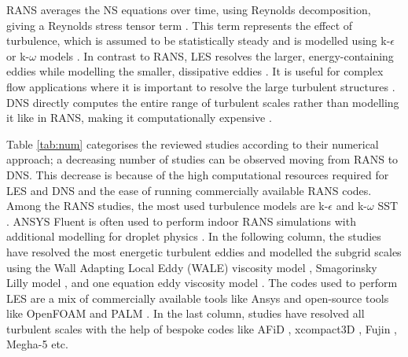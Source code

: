 \documentclass[a4paper,12pt]{elsarticle}
\begin{document}
RANS averages the NS equations over time, using Reynolds decomposition,
giving a Reynolds stress tensor term \cite{wilcox2006turbulence}. This term represents the effect of turbulence, which is assumed to be statistically steady and is modelled using k-$\epsilon$ or k-$\omega$ models \cite{pope2000turbulent}. In contrast to RANS, LES resolves the larger, energy-containing eddies while modelling the smaller, dissipative eddies \cite{sagaut2006large}. It is useful for complex flow applications where it is important to resolve the large turbulent structures \cite{smagorinsky1963general}. DNS directly computes the entire range of turbulent scales rather than modelling it like in RANS, making it computationally expensive \cite{moin2011dns}. 

Table \ref{tab:num} categorises the reviewed studies according to their numerical approach; a decreasing number of studies can be observed moving from RANS to DNS. This decrease is because of the high computational resources required for LES and DNS and the ease of running commercially available RANS codes. Among the RANS studies, the most used turbulence models are k-$\epsilon$ \cite{ren2021numerical,ou2022insufficient} and k-$\omega$ SST \cite{dbouk2020coughing,yan2021transmission}. ANSYS Fluent is often used to perform indoor RANS simulations with additional modelling for droplet physics \cite{li2020investigating,wei2023effects}. In the following column, the studies have resolved the most energetic turbulent eddies and modelled the subgrid scales using the Wall Adapting Local Eddy (WALE) viscosity model \cite{feng2020study,zhang2019distribution}, Smagorinsky Lilly model \cite{wu2023numerical,li2022airborne}, and one equation eddy viscosity model \cite{pendar2020numerical}. The codes used to perform LES are a mix of commercially available tools like Ansys \cite{saarinen2015large,feng2020study} and open-source tools like OpenFOAM and PALM \cite{vuorinen2020modelling}. In the last column, studies have resolved all turbulent scales with the help of bespoke codes like AFiD \cite{chong2021extended}, xcompact3D \cite{giri2022colliding}, Fujin \cite{rosti2020fluid}, Megha-5 \cite{singhal2022virus} etc.
\end{document}
